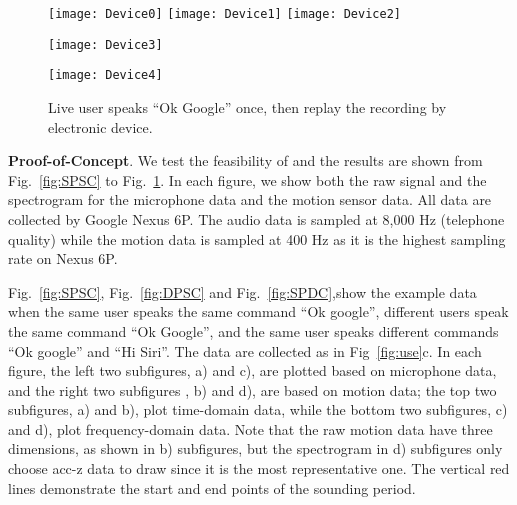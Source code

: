 \begin{figure}[h]
	\centering
	\begin{minipage}[t]{.8\linewidth}
		\centering
		\texttt{[image: Device0]}
		\vspace{-.2in}
		\vspace{.2in}
		\texttt{[image: Device1]}
		\texttt{[image: Device2]}
		\vspace{-.2in}
		\vspace{.2in}
	\end{minipage}
	\begin{minipage}[t]{.45\linewidth}
		\centering
		\texttt{[image: Device3]}
		\vspace{-.2in}
	\end{minipage}
	\begin{minipage}[t]{.45\linewidth}
		\centering
		\texttt{[image: Device4]}
		\vspace{-.2in}
	\end{minipage}
	\caption{Live user speaks ``Ok Google'' once, then replay the recording by electronic device.}
	\label{fig:device}
\end{figure}




\textbf{Proof-of-Concept}.
We test the feasibility of {\shortname} and the results are shown from Fig.~\ref{fig:SPSC} to Fig.~\ref{fig:device}. In each figure, we show both the raw signal and the spectrogram for the microphone data and the motion sensor data. All data are collected by Google Nexus 6P. The audio data is sampled at  8,000 Hz (telephone quality) while the motion data is sampled at 400 Hz as it is the highest sampling rate on Nexus 6P.


Fig.~\ref{fig:SPSC}, Fig.~\ref{fig:DPSC}  and  Fig.~\ref{fig:SPDC},show the example data when the same user speaks the same command ``Ok google'', different users speak the same command ``Ok Google'', and the same user speaks different commands ``Ok google'' and ``Hi Siri''. The data are collected as in Fig~\ref{fig:use}c.  In each figure, the left two subfigures, a) and c), are plotted based on microphone data, and the right two subfigures , b) and d),  are based on motion data; the top two subfigures, a) and b), plot time-domain data, while the bottom  two subfigures, c) and d), plot frequency-domain data. Note that the raw motion data have three dimensions, as shown in b) subfigures, but the spectrogram in d) subfigures only choose acc-z data to draw since it is the most representative one. The vertical red lines demonstrate the start and end points of the sounding period.

